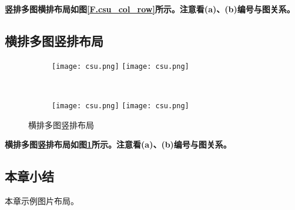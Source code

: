 \textbf{竖排多图横排布局如图\ref{F.csu_col_row}所示。注意看(a)、(b)编号与图关系。}


\subsection{横排多图竖排布局}

\lipsum

\begin{figure}[!htb]
    \centering
    \begin{subfigure}[t]{0.3\linewidth}
        \caption{}
        \begin{minipage}[b]{1\linewidth}
        \texttt{[image: csu.png]}
        \texttt{[image: csu.png]}
        \end{minipage}
    \end{subfigure}\\
    \begin{subfigure}[t]{0.3\linewidth}
        \caption{}
        \begin{minipage}[b]{1\linewidth}
        \texttt{[image: csu.png]}
        \texttt{[image: csu.png]}
        \end{minipage}
    \end{subfigure}
    \caption{横排多图竖排布局}
    \label{F.csu_row_col}
\end{figure}

\textbf{横排多图竖排布局如图\ref{F.csu_row_col}所示。注意看(a)、(b)编号与图关系。}

\subsection{本章小结}
本章示例图片布局。

\newpage
